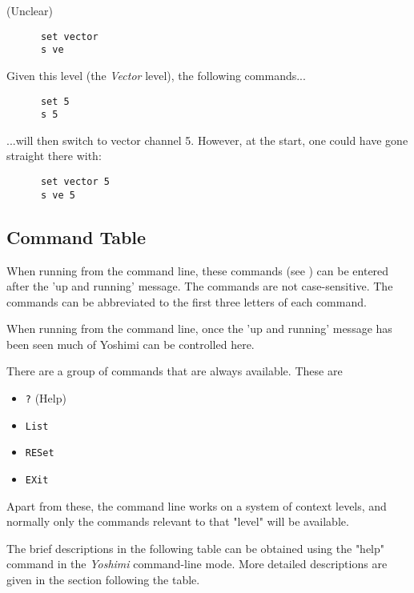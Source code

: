    (Unclear)

   \begin{verbatim}
      set vector
      s ve
   \end{verbatim}

   Given this level (the \textsl{Vector} level), the following commands...

   \begin{verbatim}
      set 5 
      s 5
   \end{verbatim}

   ...will then switch to vector channel 5.
   However, at the start, one could have gone straight there with:

   \begin{verbatim}
      set vector 5
      s ve 5
   \end{verbatim}

\subsection{Command Table}
\label{subsec:command_line_command_table}

   When running from the command line, these commands
   (see )
   can be entered after the 'up and running' message.
   The commands are not case-sensitive.
   The commands can be abbreviated to the first three letters of each command.

   When running from the command line, once the 'up and running' message has
   been seen much of Yoshimi can be controlled here.

   There are a group of commands that are always available. These are

   \begin{itemize}
      \item \texttt{?} (Help)
      \item \texttt{List}
      \item \texttt{RESet}
      \item \texttt{EXit}
   \end{itemize}

   Apart from these, the command line works on a system of context levels, and
   normally only the commands relevant to that "level" will be available.

   The brief descriptions in the following table can be obtained
   using the "help" command in the \textsl{Yoshimi} command-line mode.
   More detailed descriptions are given in the section following the table.

